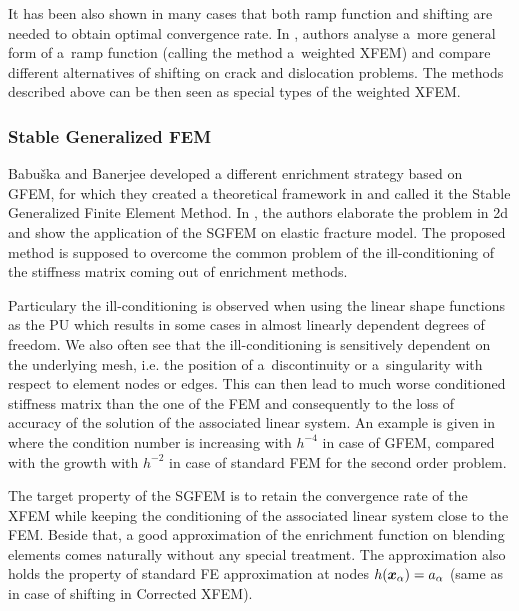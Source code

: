 It has been also shown in many cases that both ramp function and shifting are needed to obtain optimal convergence rate.
In \cite{ventura_fast_2009}, authors analyse a~more general form of a~ramp function (calling the method a~weighted XFEM)
and compare different alternatives of shifting on crack and dislocation problems. The methods described above can be then seen
as special types of the weighted XFEM. 


\subsubsection{Stable Generalized FEM}


Babuška and Banerjee developed a different enrichment strategy based on GFEM,
for which they created a theoretical framework in \cite{babuska_stable_2012} and
called it the Stable Generalized Finite Element Method.
In \cite{gupta_stable_2013}, the authors elaborate the problem in 2d and show the application of the SGFEM on elastic fracture model.
The proposed method is supposed to overcome the common problem of the ill-conditioning of the stiffness matrix coming out of enrichment methods.

Particulary the ill-conditioning is observed when using the linear shape functions as the PU which results in some cases in almost linearly dependent degrees of freedom.
We also often see that the ill-conditioning is sensitively dependent on the underlying mesh, i.e. the position of a~discontinuity or a~singularity with respect to 
element nodes or edges.
This can then lead to much worse conditioned stiffness matrix than the one of the FEM
and consequently to the loss of accuracy of the solution of the associated linear system.
An example is given in \cite{babuska_stable_2012} where the condition number is increasing with $h^{-4}$ in case of GFEM,
compared with the growth with $h^{-2}$ in case of standard FEM for the second order problem.

The target property of the SGFEM is to retain the convergence rate of the XFEM while keeping the conditioning of the associated linear system
close to the FEM. Beside that, a good approximation of the enrichment function on blending elements comes naturally without any special treatment.
The approximation also holds the property of standard FE approximation at nodes $h(\mathbf{\boldsymbol{x}}_\alpha)=a_\alpha$ (same as in case of shifting in Corrected XFEM).

